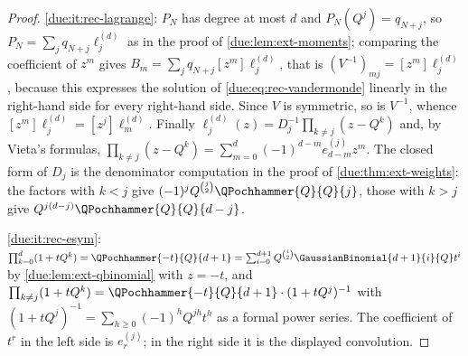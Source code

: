 \documentclass[11pt,oneside]{article}
\theoremstyle{plain}
\theoremstyle{definition}
\theoremstyle{remark}
\newcommand{\upn}[1]{\RvachevUp_{#1}}
\newcommand{\Qq}{Q}                                         %
\newcommand{\qn}[1]{q_{#1}}                                 %
\begin{document}
\begin{proof}
\ref{due:it:rec-lagrange}: $P_{N}$ has degree at most $d$ and
$P_{N}(\Qq^{j})=\qn{N+j}$, so $P_{N}=\sum_{j}\qn{N+j}\ell^{(d)}_{j}$ as in the
proof of \cref{due:lem:ext-moments}; comparing the coefficient of $z^{m}$
gives $B_{m}=\sum_{j}\qn{N+j}[z^{m}]\ell^{(d)}_{j}$, that is
$(V^{-1})_{mj}=[z^{m}]\ell^{(d)}_{j}$, because this expresses the solution of
\cref{due:eq:rec-vandermonde} linearly in the right-hand side for every
right-hand side.  Since $V$ is symmetric, so is $V^{-1}$, whence
$[z^{m}]\ell^{(d)}_{j}=[z^{j}]\ell^{(d)}_{m}$.  Finally
$\ell^{(d)}_{j}(z)=D_{j}^{-1}\prod_{k\ne j}(z-\Qq^{k})$ and, by Vieta's
formulas, $\prod_{k\ne j}(z-\Qq^{k})=\sum_{m=0}^{d}(-1)^{d-m}e^{(j)}_{d-m}z^{m}$.
The closed form of $D_{j}$ is the denominator computation in the proof of
\cref{due:thm:ext-weights}: the factors with $k<j$ give
$(-1)^{j}\Qq^{\binom{j}{2}}\QPochhammer{\Qq}{\Qq}{j}$, those with $k>j$ give
$\Qq^{j(d-j)}\QPochhammer{\Qq}{\Qq}{d-j}$.

\ref{due:it:rec-esym}: $\prod_{k=0}^{d}(1+t\Qq^{k})=\QPochhammer{-t}{\Qq}{d+1}
=\sum_{i=0}^{d+1}\Qq^{\binom{i}{2}}\GaussianBinomial{d+1}{i}{\Qq}t^{i}$ by
\cref{due:lem:ext-qbinomial} with $z=-t$, and
$\prod_{k\ne j}(1+t\Qq^{k})=\QPochhammer{-t}{\Qq}{d+1}\cdot(1+t\Qq^{j})^{-1}$
with $(1+t\Qq^{j})^{-1}=\sum_{h\ge0}(-1)^{h}\Qq^{jh}t^{h}$ as a formal power
series.  The coefficient of $t^{r}$ in the left side is $e^{(j)}_{r}$; in the
right side it is the displayed convolution.


\end{proof}
\end{document}
